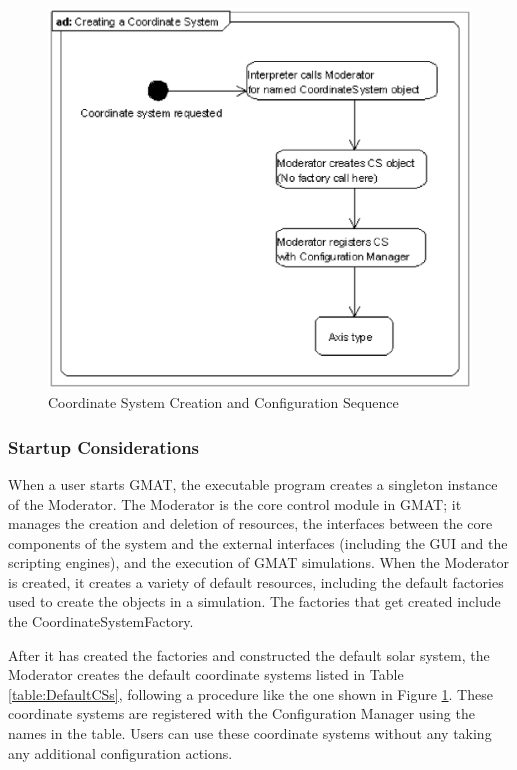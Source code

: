 \begin{figure}
\begin{center}
\includegraphics[scale=0.5]{Images/CSCreationSequence.eps}
\caption{\label{figure:CSCreationSequence}Coordinate System Creation and Configuration Sequence}
\end{center}
\end{figure}

\subsubsection{Startup Considerations}

When a user starts GMAT, the executable program creates a singleton instance of the Moderator. The
Moderator is the core control module in GMAT; it manages the creation and deletion of resources, the
interfaces between the core components of the system and the external interfaces (including the GUI
and the scripting engines), and the execution of GMAT simulations. When the Moderator is created, it
creates a variety of default resources, including the default factories used to create the objects
in a simulation. The factories that get created include the CoordinateSystemFactory.

After it has created the factories and constructed the default solar system, the Moderator creates
the default coordinate systems listed in Table \ref{table:DefaultCSs}, following a procedure like
the one shown in Figure \ref{figure:CSCreationSequence}. These coordinate systems are registered
with the Configuration Manager using the names in the table. Users can use these coordinate systems
without any taking any additional configuration actions.

